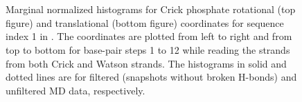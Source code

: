 \begin{figure}
\begin{center}
\\
 \\
\end{center}
\caption{Marginal normalized histograms for Crick phosphate rotational (top figure) and translational (bottom figure) coordinates for sequence index 1 in \Lbdna. The coordinates are plotted from left to right and from top to bottom for base-pair steps 1 to 12 while reading the strands from both Crick and Watson strands. 
The histograms in solid and dotted lines are for filtered (snapshots without broken H-bonds) and unfiltered MD data, respectively.
}
\label{c3:fig_hist_filter4}
\end{figure}\clearpage



